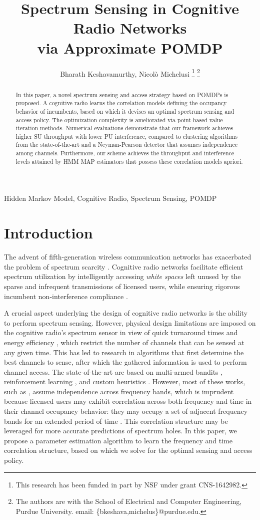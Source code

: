 \documentclass[10pt,twocolumn]{IEEEtran}
\title{Spectrum Sensing in Cognitive Radio Networks
\\
via Approximate POMDP}
\author{Bharath Keshavamurthy, Nicol\`{o} Michelusi
\thanks{This research has been funded in part by NSF under grant CNS-1642982.}
\thanks{The authors are with the School of Electrical and Computer Engineering, Purdue University. email: \{bkeshava,michelus\}@purdue.edu.}
\vspace{-12mm}}
\begin{document}
\maketitle
\thispagestyle{empty}
\pagestyle{empty} 
\begin{abstract}
In this paper, a novel spectrum sensing and access strategy based on POMDPs is proposed. A cognitive radio learns the correlation models defining the occupancy behavior of incumbents, based on which it devises an optimal spectrum sensing and access policy. The optimization complexity is ameliorated via point-based value iteration methods. Numerical evaluations demonstrate that our framework achieves higher SU throughput with lower PU interference, compared to clustering algorithms from the state-of-the-art and a Neyman-Pearson detector that assumes independence among channels. Furthermore, our scheme achieves the throughput and interference levels attained by HMM MAP estimators that possess these correlation models apriori.
\end{abstract}
\begin{IEEEkeywords}
Hidden Markov Model, Cognitive Radio, Spectrum Sensing, POMDP
\end{IEEEkeywords}
\vspace{-5mm}
\section{Introduction}\label{I}
The advent of fifth-generation wireless communication networks has exacerbated the problem of spectrum scarcity \cite{7158089}. Cognitive radio networks facilitate efficient spectrum utilization by intelligently accessing \emph{white spaces} left unused by the sparse and infrequent transmissions of licensed users, while ensuring rigorous incumbent non-interference compliance \cite{4562537}. 

A crucial aspect underlying the design of cognitive radio networks is the ability to perform spectrum sensing. However, physical design limitations are imposed on the cognitive radio's spectrum sensor in view of quick turnaround times and energy efficiency \cite{5990482}, which restrict the number of channels that can be sensed at any given time. This has led to research in algorithms that first determine the best channels to sense, after which the gathered information is used to perform channel access. The state-of-the-art are based on multi-armed bandits \cite{7094730}, reinforcement learning \cite{6507570}, and custom heuristics \cite{4554696, 6956794}. However, most of these works, such as \cite{7094730, 6507570, 7895211, 7336513, 8571293}, assume independence across frequency bands, which is imprudent because licensed users may exhibit correlation across both frequency and time in their channel occupancy behavior: they may occupy a set of adjacent frequency bands for an extended period of time \cite{6188346}. This correlation structure may be leveraged for more accurate predictions of spectrum holes. In this paper, we propose a parameter estimation algorithm to learn the frequency and time correlation structure, based on which we solve for the optimal sensing and access policy.
\end{document}
